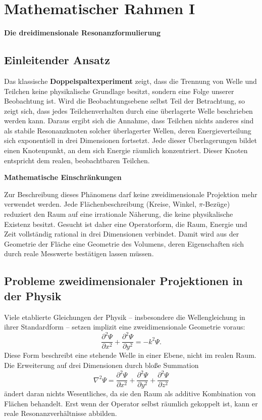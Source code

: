 \chapter{Mathematischer Rahmen I}
\begin{center}
    {\textbf{Die dreidimensionale Resonanzformulierung}}
\end{center}
\label{chap:mathematischer_rahmen_I}

\section{Einleitender Ansatz}

Das klassische
\textbf{Doppelspaltexperiment}
zeigt, dass die Trennung von Welle und Teilchen
keine physikalische Grundlage besitzt, sondern eine Folge unserer Beobachtung ist.
Wird die Beobachtungsebene selbst Teil der Betrachtung,
so zeigt sich, dass jedes Teilchenverhalten durch eine überlagerte Welle beschrieben werden kann.
Daraus ergibt sich die Annahme, dass Teilchen nichts anderes sind
als stabile Resonanzknoten solcher überlagerter Wellen,
deren Energieverteilung sich exponentiell in drei Dimensionen fortsetzt.
Jede dieser Überlagerungen bildet einen Knotenpunkt,
an dem sich Energie räumlich konzentriert. Dieser Knoten entspricht dem realen, beobachtbaren Teilchen.
\\
\begin{center}
    {\large\textbf{Mathematische Einschränkungen}}
\end{center}

Zur Beschreibung dieses Phänomens darf keine zweidimensionale Projektion mehr verwendet werden.
Jede Flächenbeschreibung (Kreise, Winkel, $\pi$-Bezüge)
reduziert den Raum auf eine irrationale Näherung, die keine physikalische Existenz besitzt.
Gesucht ist daher eine Operatorform,
die Raum, Energie und Zeit vollständig rational in drei Dimensionen verbindet.
Damit wird aus der Geometrie der Fläche eine Geometrie des Volumens,
deren Eigenschaften sich durch reale Messwerte bestätigen lassen müssen.

\section{Probleme zweidimensionaler Projektionen in der Physik}

Viele etablierte Gleichungen der Physik – insbesondere die Wellengleichung in ihrer Standardform –
setzen implizit eine zweidimensionale Geometrie voraus:
\[
\frac{\partial^2 \Psi}{\partial x^2} +
\frac{\partial^2 \Psi}{\partial y^2} = -k^2 \Psi.
\]
Diese Form beschreibt eine stehende Welle in einer Ebene,
nicht im realen Raum.
\newpage
\noindent
Die Erweiterung auf drei Dimensionen durch bloße Summation
\[
\nabla^2 \Psi =
\frac{\partial^2 \Psi}{\partial x^2} +
\frac{\partial^2 \Psi}{\partial y^2} +
\frac{\partial^2 \Psi}{\partial z^2}
\]
ändert daran nichts Wesentliches,
da sie den Raum als additive Kombination von Flächen behandelt.
Erst wenn der Operator selbst räumlich gekoppelt ist,
kann er reale Resonanzverhältnisse abbilden.

